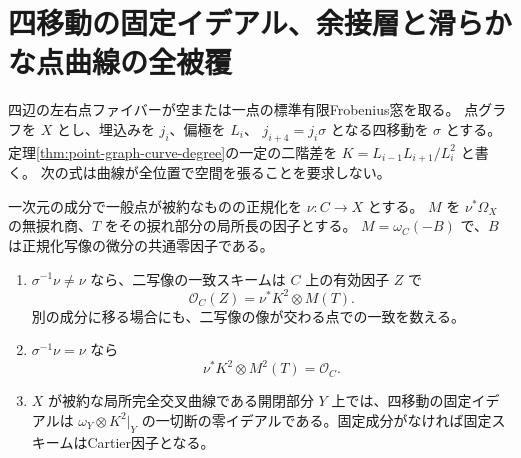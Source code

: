 \section{四移動の固定イデアル、余接層と滑らかな点曲線の全被覆}
\label{sec:point-graph-fixed-differentials}
四辺の左右点ファイバーが空または一点の標準有限Frobenius窓を取る。
点グラフを $X$ とし、埋込みを $j_i$、偏極を $L_i$、
$j_{i+4}=j_i\sigma$ となる四移動を $\sigma$ とする。
定理\ref{thm:point-graph-curve-degree}の一定の二階差を $K=L_{i-1}L_{i+1}/L_i^2$ と書く。
次の式は曲線が全位置で空間を張ることを要求しない。

\begin{theorem}\label{thm:fixed-differential}
一次元の成分で一般点が被約なものの正規化を $\nu:C\to X$ とする。
$M$ を $\nu^*\Omega_X$ の無捩れ商、$T$ をその捩れ部分の局所長の因子とする。
$M=\omega_C(-B)$ で、$B$ は正規化写像の微分の共通零因子である。
\begin{enumerate}
\item $\sigma^{-1}\nu\ne\nu$ なら、二写像の一致スキームは $C$ 上の有効因子 $Z$ で
\[
                 \mathcal O_C(Z)=\nu^*K^2\otimes M(T).
\]
別の成分に移る場合にも、二写像の像が交わる点での一致を数える。
\item $\sigma^{-1}\nu=\nu$ なら
\[
                   \nu^*K^2\otimes M^2(T)=\mathcal O_C .
\]
\item $X$ が被約な局所完全交叉曲線である開閉部分 $Y$ 上では、四移動の固定イデアルは
$\omega_Y\otimes K^2|_Y$ の一切断の零イデアルである。固定成分がなければ固定スキームはCartier因子となる。
\end{enumerate}
\end{theorem}
